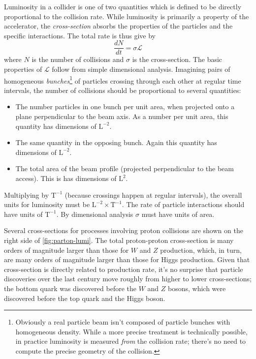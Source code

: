 Luminosity in a collider is one of two quantities which is defined to be directly proportional to the collision rate.
While luminosity is primarily a property of the accelerator, the \emph{cross-section} absorbs the properties of the particles and the specific interactions.
The total rate is thus give by
\begin{equation}
  \frac{d N}{d t} = \sigma \mathcal{L}
  \label{eq:lumi-cross-section}
\end{equation}
where $N$ is the number of collisions and $\sigma$ is the cross-section.
The basic properties of $\mathcal{L}$ follow from simple dimensional analysis.
Imagining pairs of homogeneous \emph{bunches}\footnote{Obviously a real particle beam isn't composed of particle bunches with homogeneous density. While a more precise treatment is technically possible, in practice luminosity is measured \emph{from} the collision rate; there's no need to compute the precise geometry of the collision.} of particles crossing through each other at regular time intervals, the number of collisions should be proportional to several quantities:
\begin{itemize}
\item The number particles in one bunch per unit area, when projected onto a plane perpendicular to the beam axis. As a number per unit area, this quantity has dimensions of $\mathrm{L}^{-2}$.
\item The same quantity in the opposing bunch. Again this quantity has dimensions of $\mathrm{L}^{-2}$.
\item The total area of the beam profile (projected perpendicular to the beam access). This is has dimensions of $\mathrm{L}^2$.
\end{itemize}
Multiplying by $\mathrm{T}^{-1}$ (because crossings happen at regular intervals), the overall units for luminosity must be $\mathrm{L}^{-2} \times \mathrm{T}^{-1}$.
The rate of particle interactions should have units of $\mathrm{T}^{-1}$. By dimensional analysis $\sigma$ must have units of area.

Several cross-sections for processes involving proton collisions are shown on the right side of \cref{fig:parton-lumi}.
The total proton-proton cross-section is many orders of magnitude larger than those for $W$ and $Z$ production, which, in turn, are many orders of magnitude larger than those for Higgs production.
Given that cross-section is directly related to production rate, it's no surprise that particle discoveries over the last century move roughly from higher to lower cross-sections; the bottom quark was discovered before the $W$ and $Z$ bosons, which were discovered before the top quark and the Higgs boson.

